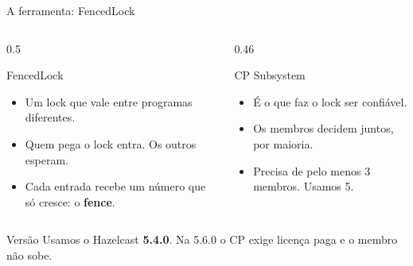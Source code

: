 \documentclass[aspectratio=169,11pt]{beamer}
\begin{document}
\begin{frame}{A ferramenta: FencedLock}
\begin{columns}[T]
\begin{column}{0.5\textwidth}\begin{block}{FencedLock}
\begin{itemize}\setlength\itemsep{0.2cm}\small
\item Um lock que vale entre programas diferentes.
\item Quem pega o lock entra. Os outros esperam.
\item Cada entrada recebe um número que só cresce: o \textbf{fence}.
\end{itemize}\end{block}\end{column}
\begin{column}{0.46\textwidth}\begin{block}{CP Subsystem}
\begin{itemize}\setlength\itemsep{0.2cm}\small
\item É o que faz o lock ser confiável.
\item Os membros decidem juntos, por maioria.
\item Precisa de pelo menos 3 membros. Usamos 5.
\end{itemize}\end{block}\end{column}
\end{columns}
\vspace{0.25cm}
\begin{alertblock}{Versão}
\small Usamos o Hazelcast \textbf{5.4.0}. Na 5.6.0 o CP exige licença paga e o membro não sobe.
\end{alertblock}
\end{frame}
\end{document}
